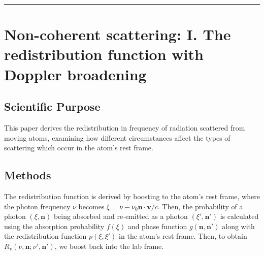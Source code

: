 \documentclass[onecolumn]{aastex63}
\begin{document}
\vspace{1cm}
\hrule
\vspace{1cm}

\section{ Non-coherent scattering: I. The redistribution function with Doppler broadening}
\begin{centering}

\cite{hummer1962}

\end{centering}



\subsection{Scientific Purpose}

This paper derives the redistribution in frequency of radiation scattered from moving atoms, examining how different circumstances affect the types of scattering which occur in the atom's rest frame. 

\subsection{Methods}

The redistribution function is derived by boosting to the atom's rest frame, where the photon frequency $\nu$ becomes $\xi = \nu - \nu_0 \mathbf{n}\cdot \mathbf{v}/c$. Then, the probability of a photon $(\xi, \mathbf{n})$ being absorbed and re-emitted as a photon $(\xi', \mathbf{n}')$ is calculated using the absorption probability $f(\xi)$ and phase function $g(\mathbf{n}, \mathbf{n}')$ along with the redistribution function $p(\xi, \xi')$ in the atom's rest frame. Then, to obtain $R_v(\nu, \mathbf{n}; \nu', \mathbf{n}')$, we boost back into the lab frame.

\end{document}
